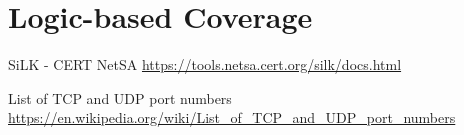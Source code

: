 \documentclass[12pt]{article}
\begin{document}
\section{Logic-based Coverage}





\begin{thebibliography}{9}
SiLK - CERT NetSA
\url{https://tools.netsa.cert.org/silk/docs.html}

List of TCP and UDP port numbers
\url{https://en.wikipedia.org/wiki/List_of_TCP_and_UDP_port_numbers}



\end{thebibliography}



\end{document}
